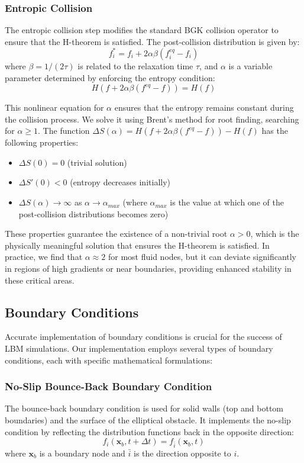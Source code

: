 \documentclass[12pt,a4paper]{article}
\begin{document}
\subsubsection{Entropic Collision}
The entropic collision step modifies the standard BGK collision operator to ensure that the H-theorem is satisfied. The post-collision distribution is given by:
\begin{equation}
f_i^* = f_i + 2\alpha\beta(f_i^{eq} - f_i)
\end{equation}
where $\beta = 1/(2\tau)$ is related to the relaxation time $\tau$, and $\alpha$ is a variable parameter determined by enforcing the entropy condition:
\begin{equation}
H(f + 2\alpha\beta(f^{eq} - f)) = H(f)
\end{equation}

This nonlinear equation for $\alpha$ ensures that the entropy remains constant during the collision process. We solve it using Brent's method for root finding, searching for $\alpha \geq 1$. The function $\Delta S(\alpha) = H(f + 2\alpha\beta(f^{eq} - f)) - H(f)$ has the following properties:
\begin{itemize}
    \item $\Delta S(0) = 0$ (trivial solution)
    \item $\Delta S'(0) < 0$ (entropy decreases initially)
    \item $\Delta S(\alpha) \to \infty$ as $\alpha \to \alpha_{max}$ (where $\alpha_{max}$ is the value at which one of the post-collision distributions becomes zero)
\end{itemize}

These properties guarantee the existence of a non-trivial root $\alpha > 0$, which is the physically meaningful solution that ensures the H-theorem is satisfied. In practice, we find that $\alpha \approx 2$ for most fluid nodes, but it can deviate significantly in regions of high gradients or near boundaries, providing enhanced stability in these critical areas.

\subsection{Boundary Conditions}
Accurate implementation of boundary conditions is crucial for the success of LBM simulations. Our implementation employs several types of boundary conditions, each with specific mathematical formulations:

\subsubsection{No-Slip Bounce-Back Boundary Condition}
The bounce-back boundary condition is used for solid walls (top and bottom boundaries) and the surface of the elliptical obstacle. It implements the no-slip condition by reflecting the distribution functions back in the opposite direction:
\begin{equation}
f_i(\mathbf{x}_b, t+\Delta t) = f_{\bar{i}}(\mathbf{x}_b, t)
\end{equation}
where $\mathbf{x}_b$ is a boundary node and $\bar{i}$ is the direction opposite to $i$.
\end{document}
